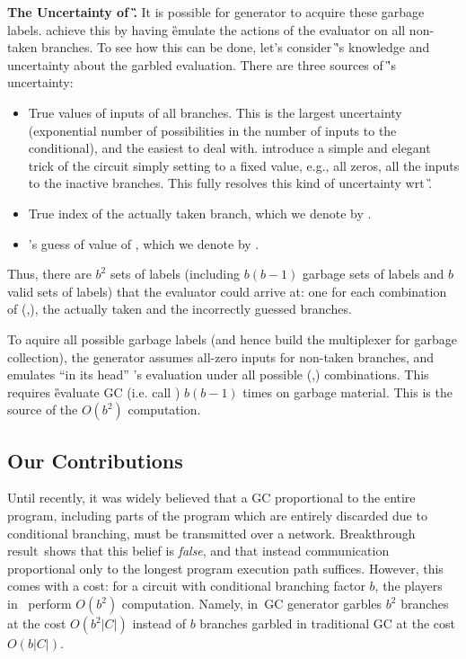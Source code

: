 {\bf The Uncertainty of \G.}
It is possible for generator to acquire these garbage labels.  \HK achieve this by having \G  emulate the actions of the
evaluator \E on all non-taken branches.  To see how this can be done, let's consider \G's knowledge and uncertainty about the garbled evaluation.  There are three sources of \G's uncertainty:
\begin{itemize}
	\item True values of inputs of all branches.  This is the largest uncertainty (exponential number of possibilities in the number of inputs to the conditional), and the easiest to deal with.  \HK introduce a simple and elegant trick of the circuit simply setting to a fixed value, e.g., all zeros, all the inputs to the inactive branches.  This fully resolves this kind of uncertainty wrt \G.
	\item True index of the actually taken branch, which we denote by \truth.
	\item \E's guess of value of \truth, which we denote by \guess.
\end{itemize}

Thus, there are $b^2$   sets of labels (including  $b(b-1)$ garbage sets of labels and $b$ valid sets of labels)  that the evaluator
could arrive at: one for each combination of (\truth,\guess), the  actually taken  and
the incorrectly guessed branches. 
%


To aquire all possible garbage labels (and hence build the multiplexer for garbage collection), the \HK generator assumes all-zero inputs for non-taken branches, and emulates ``in its head'' \E's evaluation under all possible (\truth,\guess) combinations.  
This requires \G evaluate GC (i.e. call \Ev) $b(b-1)$ times on garbage material.
This is the source of the $O(b^2)$ computation.






\subsection{Our Contributions}
\label{sec:ourContrib}

Until recently, it was widely believed that a GC
proportional to the entire program, including parts of the program
which are entirely discarded due to conditional branching, must
be transmitted over a network.
Breakthrough result~\HK shows that this belief is \emph{false}, and that instead
communication proportional only to the longest program execution
path suffices.  However, this comes with a cost:
for a circuit with conditional branching factor $b$, the players in~\HK 
perform $O(b^2)$ computation.  Namely, in~\HK GC generator garbles $b^2$ branches at the cost $O(b^2|C|)$  instead of $b$ branches garbled in traditional GC at the cost $O(b|C|)$.

